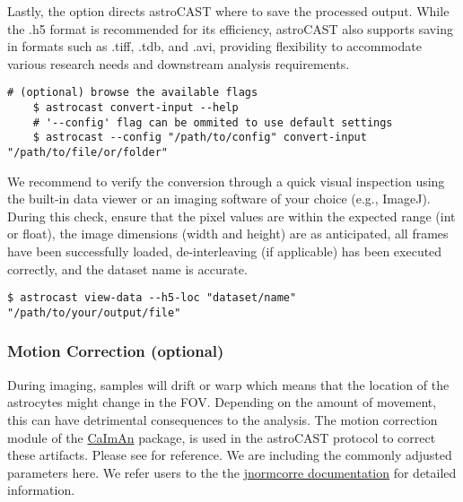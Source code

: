 Lastly, the  option directs astroCAST where to save the processed output. While the .h5 format is recommended for its efficiency, astroCAST also supports saving in formats such as .tiff, .tdb, and .avi, providing flexibility to accommodate various research needs and downstream analysis requirements.

\begin{lstlisting}[style=bashStyle]
    # (optional) browse the available flags
    $ astrocast convert-input --help
    # '--config' flag can be ommited to use default settings
    $ astrocast --config "/path/to/config" convert-input "/path/to/file/or/folder"
\end{lstlisting}

We recommend to verify the conversion through a quick visual inspection using the built-in data viewer or an imaging software of your choice (e.g., ImageJ). During this check, ensure that the pixel values are within the expected range (int or float), the image dimensions (width and height) are as anticipated, all frames have been successfully loaded, de-interleaving (if applicable) has been executed correctly, and the dataset name is accurate.

\begin{lstlisting}[style=bashStyle]
    $ astrocast view-data --h5-loc "dataset/name" "/path/to/your/output/file"
\end{lstlisting}

\subsubsection{Motion Correction (optional)}

During imaging, samples will drift or warp which means that the location of the astrocytes might change in the \ac{FOV}. Depending on the amount of movement, this can have detrimental consequences to the analysis. The motion correction module of the \href{https://github.com/flatironinstitute/CaImAn}{CaImAn} package\citep{giovannucci_caiman_2019}, is used in the astroCAST protocol to correct these artifacts. Please see  for reference. We are including the commonly adjusted parameters here. We refer users to the the \href{https://jnormcorre.readthedocs.io/en/latest/Algo.html#motion-correction-methods}{jnormcorre documentation} for detailed information.

